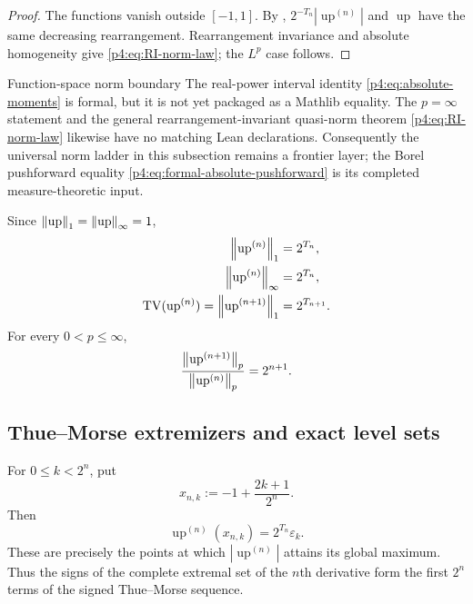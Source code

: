 \documentclass[11pt,oneside]{article}
\theoremstyle{definition}
\theoremstyle{remark}
\newcommand{\Up}{\operatorname{up}}
\begin{document}
\begin{proof}
The functions vanish outside $[-1,1]$.  By ,
$2^{-T_n}|\Up^{(n)}|$ and $\Up$ have the same decreasing rearrangement.  Rearrangement
invariance and absolute homogeneity give \eqref{p4:eq:RI-norm-law}; the $L^p$ case follows.
\end{proof}

\begin{statusbox}{Function-space norm boundary}
The real-power interval identity \eqref{p4:eq:absolute-moments} is formal, but it is not yet
packaged as a Mathlib  equality.  The \(p=\infty\) statement and the general
rearrangement-invariant quasi-norm theorem \eqref{p4:eq:RI-norm-law} likewise have no matching
Lean declarations.  Consequently the universal norm ladder in this subsection remains a
frontier layer; the Borel pushforward equality
\eqref{p4:eq:formal-absolute-pushforward} is its completed measure-theoretic input.
\end{statusbox}

\begin{corollary}
\label{p4:cor:sup-TV}
Since $\norm{\Up}_1=\norm{\Up}_\infty=1$,
\begin{align}
 \norm{\Up^{(n)}}_1&=2^{T_n},\label{p4:eq:L1-exact}\\
 \norm{\Up^{(n)}}_\infty&=2^{T_n},\label{p4:eq:Linf-exact}\\
 \operatorname{TV}(\Up^{(n)})
 =\norm{\Up^{(n+1)}}_1&=2^{T_{n+1}}.
 \label{p4:eq:TV-exact}
\end{align}
For every $0<p\leq\infty$,
\begin{equation}
 \frac{\norm{\Up^{(n+1)}}_p}{\norm{\Up^{(n)}}_p}=2^{n+1}.
 \label{p4:eq:successive-norm-ratio}
\end{equation}
\end{corollary}

\subsection{Thue--Morse extremizers and exact level sets}

\begin{corollary}
\label{p4:cor:midpoint-extrema}
For $0\leq k<2^n$, put
\begin{equation}
 x_{n,k}:=-1+\frac{2k+1}{2^n}.
 \label{p4:eq:cell-midpoints}
\end{equation}
Then
\begin{equation}
 \boxed{
 \Up^{(n)}(x_{n,k})=2^{T_n}\varepsilon_k.}
 \label{p4:eq:midpoint-values}
\end{equation}
These are precisely the points at which $|\Up^{(n)}|$ attains its global maximum.
Thus the signs of the complete extremal set of the $n$th derivative form the first $2^n$
terms of the signed Thue--Morse sequence.
\end{corollary}
\end{document}
